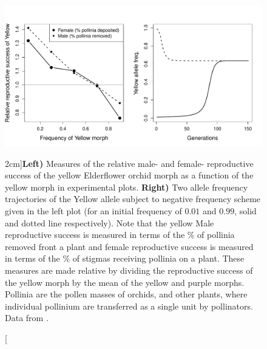 {\begin{figure}
\begin{center}
  \includegraphics[width = \textwidth]{Journal_figs/single_locus_selection/Elderflower_orchid/Elderflower_orchids_fitness.pdf}
\end{center}
\caption[][2cm]{{\bf Left)} Measures of the relative male- and female- reproductive success of the yellow Elderflower orchid morph
  as a function of the yellow morph in experimental plots. {\bf
    Right)} Two allele frequency trajectories of the Yellow allele
  subject to negative frequency scheme given in the left plot
  (for an initial frequency of $0.01$ and $0.99$, solid and dotted
  line respectively). Note that the yellow 
  Male
  reproductive success is measured in terms of the \% of pollinia
  removed front a plant and female reproductive success is measured in terms of the
  \% of stigmas receiving pollinia on a plant. These measures are made
relative by dividing the reproductive success of the yellow morph by the
mean of the yellow and purple morphs. Pollinia are the pollen masses of
orchids, and other plants, where individual pollinium are transferred
as a single unit by pollinators. Data from
\citet{gigord2001negative}. } \label{fig:Elderflower_orchids_fitness}  
\end{figure}


}
